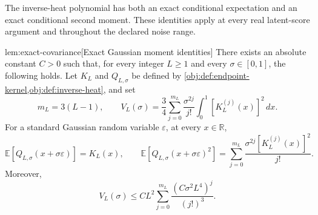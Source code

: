 \documentclass[11pt]{article}
\begin{document}
The inverse-heat polynomial has both an exact conditional expectation and an exact conditional second moment. These identities apply at every real latent-score argument and throughout the declared noise range.

\begin{lemmav}{lem:exact-covariance}[Exact Gaussian moment identities]
There exists an absolute constant \(C>0\) such that, for every integer \(L\ge1\) and every \(\sigma\in[0,1]\), the following holds. Let \(K_L\) and \(Q_{L,\sigma}\) be defined by \cref{obj:def:endpoint-kernel,obj:def:inverse-heat}, and set
\[
m_L=3(L-1),\qquad
V_L(\sigma)=\frac34\sum_{j=0}^{m_L}\frac{\sigma^{2j}}{j!}
\int_0^1 [K_L^{(j)}(x)]^2\,dx.
\]
For a standard Gaussian random variable \(\varepsilon\), at every \(x\in\mathbb R\),
\[
\mathbb E\!\left[Q_{L,\sigma}(x+\sigma\varepsilon)\right]=K_L(x),
\qquad
\mathbb E\!\left[Q_{L,\sigma}(x+\sigma\varepsilon)^2\right]
=\sum_{j=0}^{m_L}\frac{\sigma^{2j}[K_L^{(j)}(x)]^2}{j!}.
\]
Moreover,
\[
V_L(\sigma)\le C L^2
\sum_{j=0}^{m_L}\frac{(C\sigma^2L^4)^j}{(j!)^3}.
\]
\end{lemmav}
\end{document}
